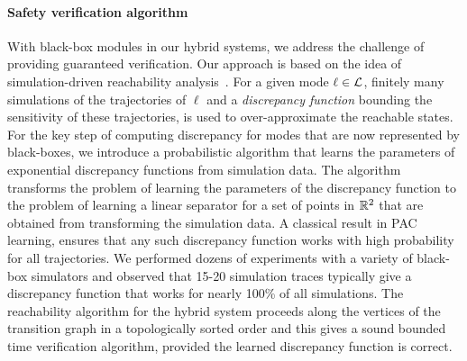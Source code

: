 \paragraph{Safety verification algorithm}
With black-box modules in our hybrid systems, we address the  challenge of providing guaranteed verification. Our approach is based on the idea of simulation-driven reachability analysis~\cite{fan2016automatic,DMV:EMSOFT2013,DuggiralaMV:2015c2e2}. For a given mode $\ell \in {\mathcal L}$, finitely many simulations of the trajectories of $\ell$ and a {\em discrepancy function\/} bounding the sensitivity of these trajectories, is used to over-approximate the reachable states.
For the key step of computing  discrepancy for modes that are now represented by  black-boxes, we introduce a probabilistic algorithm that learns the parameters of exponential discrepancy functions from simulation data. The algorithm transforms the problem of learning the parameters of the discrepancy function to the problem of learning a linear separator for a set of points in $\reals^2$ that are obtained from transforming the simulation data. 
%
A classical result in PAC learning, ensures that any such discrepancy function works with high probability for all trajectories. We performed dozens of experiments with a variety of black-box simulators and observed that 15-20 simulation traces typically give a discrepancy function that works for nearly 100\% of all simulations.
%
The reachability algorithm  for the hybrid system proceeds along the vertices of the transition graph in a topologically sorted order and this gives a sound bounded time verification algorithm, provided the learned discrepancy function is correct. 





\vspace{-10pt}
